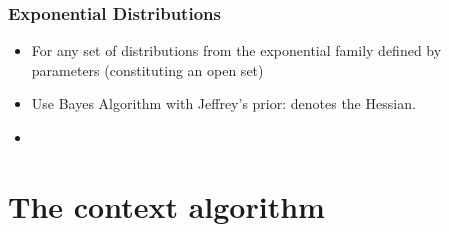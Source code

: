 \documentclass{beamer}
\begin{document}
\begin{frame}
\frametitle{Exponential Distributions}
\begin{itemize}
\item For any set of distributions from the exponential family
  defined by  parameters (constituting an open set) \B{[Rissanen96]}
\item Use Bayes Algorithm with Jeffrey's prior:
\R{\[
\dweight{\btheta}{*} = \frac{1}{Z} 
\frac{1}{\sqrt{
\left| \left. {\mathbf H} \paren{D_{KL} (\btheta || \theta) } \right|_{\theta=\btheta} \right|
}}
\]}
 denotes the Hessian.
\item
{}
\end{itemize}
\end{frame}

\section{The context algorithm}
\end{document}
